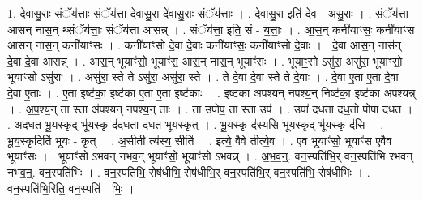 \documentclass[17pt]{extarticle}
\begin{document}
1. दे॒वा॒सु॒राः संॅय॑त्ताः॒ संॅय॑त्ता देवासु॒रा दे॑वासु॒राः संॅय॑त्ताः । . दे॒वा॒सु॒रा इति॑ देव - अ॒सु॒राः । . संॅय॑त्ता आसन् नास॒न् थ्संॅय॑त्ताः॒ संॅय॑त्ता आसन्न् । . संॅय॑त्ता॒ इति॒ सं - य॒त्ताः॒ । . आ॒स॒न् कनी॑याꣳसः॒ कनी॑याꣳस आसन् नास॒न् कनी॑याꣳसः । . कनी॑याꣳसो दे॒वा दे॒वाः कनी॑याꣳसः॒ कनी॑याꣳसो दे॒वाः । . दे॒वा आस॒न् नास॑न् दे॒वा दे॒वा आसन्न्॑ । . आस॒न् भूयाꣳ॑सो॒ भूयाꣳ॑स॒ आस॒न् नास॒न् भूयाꣳ॑सः । . भूयाꣳ॒॒सो ऽसु॑रा॒ असु॑रा॒ भूयाꣳ॑सो॒ भूयाꣳ॒॒सो ऽसु॑राः । . असु॑रा॒ स्ते ते ऽसु॑रा॒ असु॑रा॒ स्ते । . ते दे॒वा दे॒वा स्ते ते दे॒वाः । . दे॒वा ए॒ता ए॒ता दे॒वा दे॒वा ए॒ताः । . ए॒ता इष्ट॑का॒ इष्ट॑का ए॒ता ए॒ता इष्ट॑काः । . इष्ट॑का अपश्यन् नपश्य॒न् निष्ट॑का॒ इष्ट॑का अपश्यन्न् । . अ॒प॒श्य॒न् ता स्ता अ॑पश्यन् नपश्य॒न् ताः । . ता उपोप॒ ता स्ता उप॑ । . उपा॑ दधता दध॒तो पोपा॑ दधत । . अ॒द॒ध॒त॒ भू॒य॒स्कृद् भू॑य॒स्कृ द॑दधता दधत भूय॒स्कृत् । . भू॒य॒स्कृ द॑स्यसि भूय॒स्कृद् भू॑य॒स्कृ द॑सि । . भू॒य॒स्कृदिति॑ भूयः - कृत् । . अ॒सीती त्य॑स्य॒ सीति॑ । . इत्ये॒ वैवे तीत्ये॒व । . ए॒व भूयाꣳ॑सो॒ भूयाꣳ॑स ए॒वैव भूयाꣳ॑सः । . भूयाꣳ॑सो ऽभवन् नभव॒न् भूयाꣳ॑सो॒ भूयाꣳ॑सो ऽभवन्न् । . अ॒भ॒व॒न्॒. वन॒स्पति॑भि॒र् वन॒स्पति॑भि रभवन् नभव॒न्॒. वन॒स्पति॑भिः । . वन॒स्पति॑भि॒ रोष॑धीभि॒ रोष॑धीभि॒र् वन॒स्पति॑भि॒र् वन॒स्पति॑भि॒ रोष॑धीभिः । . वन॒स्पति॑भि॒रिति॒ वन॒स्पति॑ - भिः॒ । \newline
\end{document}
